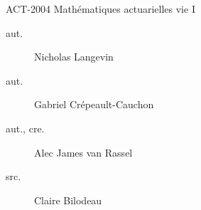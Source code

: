\begin{contrib}{ACT-2004\: Mathématiques actuarielles vie I}
\begin{description}
	\item[aut.] Nicholas Langevin
	\item[aut.] Gabriel Crépeault-Cauchon 
	\item[aut., cre.] Alec James van Rassel
	\item[src.]	Claire Bilodeau
\end{description}
\end{contrib}
